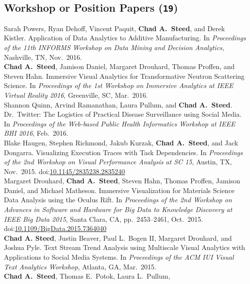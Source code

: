 \documentclass[11pt, letterpaper]{article}
\newcommand{\years}[1]{\marginnote{\scriptsize #1}}
\begin{document}
\subsection*{Workshop or Position Papers (\texttt{19})}

\begin{sloppypar}
\noindent\years{2016}Sarah Powers, Ryan Dehoff, Vincent Paquit,
\textbf{Chad A.\ Steed}, and Derek Kistler. Application of Data Analytics
to Additive Manufacturing.
In \emph{Proceedings of the 11th INFORMS Workshop on Data Mining and
Decision Analytics}, Nashville, TN, Nov.\ 2016.\\
\years{2016}\textbf{Chad A.\ Steed}, Jamison Daniel, Margaret
Drouhard, Thomas Proffen, and Steven Hahn. Immersive Visual Analytics for
Transformative Neutron Scattering Science.
In \emph{Proceedings of the 1st Workshop on Immersive Analytics at IEEE Virtual
Reality 2016}, Greenville, SC, Mar.\ 2016.\\
\years{2016}Shannon Quinn, Arvind Ramanathan, Laura Pullum, and
\textbf{Chad A.\ Steed}. Dr.\ Twitter: The Logistics of Practical Disease
Surveillance using Social Media.
In \emph{Proceedings of the Web-based Public Health Informatics Workshop at
IEEE BHI 2016}, Feb.\ 2016.\\
\years{2015}Blake Haugen, Stephen Richmond, Jakub Kurzak,
\textbf{Chad A.\ Steed}, and Jack Dongarra. Visualizing Execution Traces
with Task Dependencies.
In \emph{Proceedings of the 2nd Workshop on Visual Performance Analysis at SC 15}, Austin, TX, Nov.\ 2015.
doi:\href{http://dx.doi.org/10.1145/2835238.2835240}
{10.1145/2835238.2835240}\\
\years{2015}Margaret Drouhard, \textbf{Chad A.\ Steed}, Steven Hahn,
Thomas Proffen, Jamison Daniel, and Michael Matheson. Immersive Visualization
for Materials Science Data Analysis using the Oculus Rift.
In \emph{Proceedings of the 2nd Workshop on Advances in Software and Hardware for Big Data to Knowledge Discovery at IEEE Big Data 2015}, Santa Clara, CA, pp.\ 2453--2461, Oct.\ 2015. doi:\href{http://dx.doi.org/10.1109/BigData.2015.7364040}{10.1109/BigData.2015.7364040}\\
\years{2015}\textbf{Chad A. Steed}, Justin Beaver, Paul L.\ Bogen II,
Margaret Drouhard, and Joshua Pyle.  Text Stream Trend Analysis using
Multiscale Visual Analytics with Applications to Social Media Systems.
In \emph{Proceedings of the ACM IUI Visual Text Analytics Workshop}, Atlanta,
GA, Mar.\ 2015.\\
\years{2013}\textbf{Chad A.\ Steed}, Thomas E.\ Potok, Laura L.\ Pullum,

\end{sloppypar}
\end{document}
